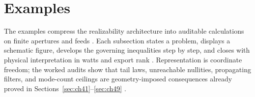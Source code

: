 \section{Examples}
\label{sec:ch410}

The examples compress the realizability architecture into auditable calculations on finite apertures and feeds \cite{stratton1941,harrington2001,hansen1988,devaney2004}.
Each subsection states a problem, displays a schematic figure, develops the governing inequalities step by step, and closes with physical interpretation in
watts and export rank \cite{jackson1999,collin2001}. Representation is coordinate freedom; the worked audits show that tail laws, unreachable nullities,
propagating filters, and mode-count ceilings are geometry-imposed consequences already proved in Sections~\ref{sec:ch41}--\ref{sec:ch49} \cite{stratton1941,harrington2001}.
